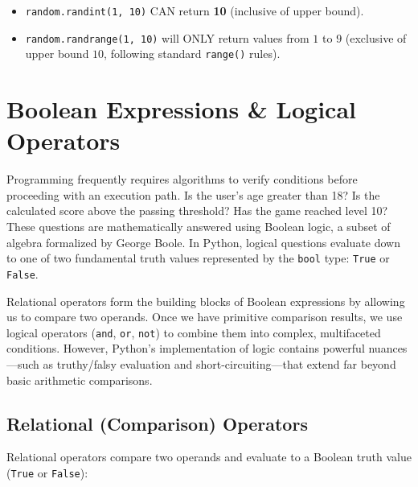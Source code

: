 \begin{examtip}
\begin{itemize}
    \item \texttt{random.randint(1, 10)} CAN return \textbf{10} (inclusive of upper bound).
    \item \texttt{random.randrange(1, 10)} will ONLY return values from $1$ to $9$ (exclusive of upper bound $10$, following standard \texttt{range()} rules).
\end{itemize}
\end{examtip}

\section{Boolean Expressions \& Logical Operators}

Programming frequently requires algorithms to verify conditions before proceeding with an execution path. Is the user's age greater than 18? Is the calculated score above the passing threshold? Has the game reached level 10? These questions are mathematically answered using Boolean logic, a subset of algebra formalized by George Boole. In Python, logical questions evaluate down to one of two fundamental truth values represented by the \texttt{bool} type: \texttt{True} or \texttt{False}.

Relational operators form the building blocks of Boolean expressions by allowing us to compare two operands. Once we have primitive comparison results, we use logical operators (\texttt{and}, \texttt{or}, \texttt{not}) to combine them into complex, multifaceted conditions. However, Python's implementation of logic contains powerful nuances---such as truthy/falsy evaluation and short-circuiting---that extend far beyond basic arithmetic comparisons.

\subsection{Relational (Comparison) Operators}

Relational operators compare two operands and evaluate to a Boolean truth value (\texttt{True} or \texttt{False}):

